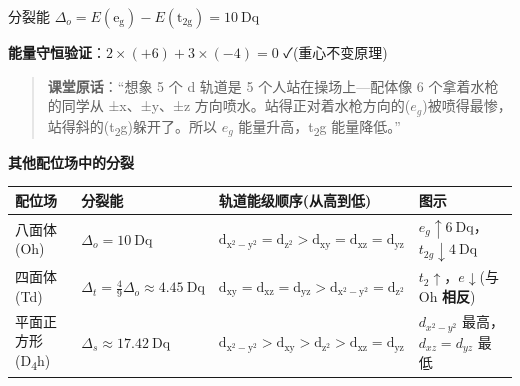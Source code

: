分裂能 \(\Delta_o = E(\mathrm{e_g}) - E(\mathrm{t_{2g}}) = 10\ \mathrm{Dq}\)

\textbf{能量守恒验证}：\(2 \times (+6) + 3 \times (-4) = 0\) ✓(重心不变原理)

\begin{quote}
\textbf{课堂原话}：``想象 5 个 d 轨道是 5 个人站在操场上---配体像 6 个拿着水枪的同学从 ±x、±y、±z 方向喷水。站得正对着水枪方向的(\(e_g\))被喷得最惨，站得斜的(t\textsubscript{2}g)躲开了。所以 \(e_g\) 能量升高，t\textsubscript{2}g 能量降低。''
\end{quote}

\textbf{其他配位场中的分裂}

{\def\LTcaptype{none} %
\begin{longtable}[]{@{}
  >{\centering\arraybackslash}p{}
  >{\centering\arraybackslash}p{}
  >{\raggedright\arraybackslash}p{}
  >{\centering\arraybackslash}p{}@{}}
\toprule\noalign{}
\begin{minipage}[b]{\linewidth}\centering
配位场
\end{minipage} & \begin{minipage}[b]{\linewidth}\centering
分裂能
\end{minipage} & \begin{minipage}[b]{\linewidth}\raggedright
轨道能级顺序(从高到低)
\end{minipage} & \begin{minipage}[b]{\linewidth}\centering
图示
\end{minipage} \\
\midrule\noalign{}
\endhead
\bottomrule\noalign{}
\endlastfoot
八面体(Oh) & \(\Delta_o = 10\ \mathrm{Dq}\) & \(\mathrm{d_{x^2-y^2} = d_{z^2} > d_{xy} = d_{xz} = d_{yz}}\) & \(e_g \uparrow 6\ \mathrm{Dq}\)，\(t_{2g} \downarrow 4\ \mathrm{Dq}\) \\
四面体(Td) & \(\Delta_t = \frac{4}{9}\Delta_o \approx 4.45\ \mathrm{Dq}\) & \(\mathrm{d_{xy} = d_{xz} = d_{yz} > d_{x^2-y^2} = d_{z^2}}\) & \(t_2 \uparrow\)，\(e \downarrow\)(与 Oh \textbf{相反}) \\
平面正方形(D\textsubscript{4}h) & \(\Delta_s \approx 17.42\ \mathrm{Dq}\) & \(\mathrm{d_{x^2-y^2} > d_{xy} > d_{z^2} > d_{xz} = d_{yz}}\) & \(d_{x^2-y^2}\) 最高，\(d_{xz}=d_{yz}\) 最低 \\
\end{longtable}
}

